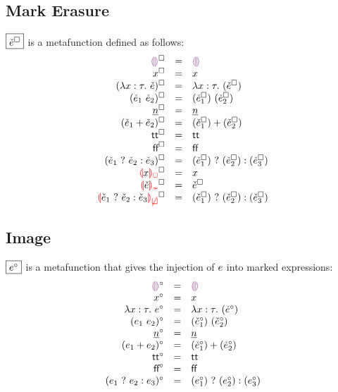 \documentclass{article}
\begin{document}
\subsection{Mark Erasure}
$\judgbox{\erase{\ECMV}}$ is a metafunction defined as follows:
%
\newcommand{\erasesToRow}[2]{\erase{#1} & = & #2}
\[\begin{array}{rcl}
  \erasesToRow{\ECEHole}{\EEHole} \\
  \erasesToRow{x}{x} \\
  \erasesToRow{(\ECLam{x}{\TMV}{\ECMV})}{\ELam{x}{\TMV}{(\erase{\ECMV})}} \\
  \erasesToRow{(\ECAp{\ECMV_1}{\ECMV_2})}{\EAp{(\erase{\ECMV_1})}{(\erase{\ECMV_2})}} \\
  \erasesToRow{\ECNumMV}{\ENumMV} \\
  \erasesToRow{(\ECPlus{\ECMV_1}{\ECMV_2})}{\EPlus{(\erase{\ECMV_1})}{(\erase{\ECMV_2})}} \\
  \erasesToRow{\ECTrue}{\ETrue} \\
  \erasesToRow{\ECFalse}{\EFalse} \\
  \erasesToRow{(\ECIf{\ECMV_1}{\ECMV_2}{\ECMV_3})}{\EIf{(\erase{\ECMV_1})}{(\erase{\ECMV_2})}{(\erase{\ECMV_3})}} \\
  \erasesToRow{\ECUnbound{x}}{x} \\
  \erasesToRow{\ECInconType{\ECMV}}{\erase{\ECMV}} \\
  \erasesToRow{\ECInconBr{\ECMV_1}{\ECMV_2}{\ECMV_3}}{\EIf{(\erase{\ECMV_1})}{(\erase{\ECMV_2})}{(\erase{\ECMV_3})}} \\
\end{array}\]

\subsection{Image}
$\judgbox{\image{\EMV}}$ is a metafunction that gives the injection of $e$ into marked
expressions:
%
\newcommand{\imageIsRow}[2]{\image{#1} & = & #2}
\[\begin{array}{rcl}
  \imageIsRow{\EEHole}{\ECEHole} \\
  \imageIsRow{x}{x} \\
  \imageIsRow{\ELam{x}{\TMV}{\EMV}}{\ECLam{x}{\TMV}{(\image{\ECMV})}} \\
  \imageIsRow{(\EAp{\EMV_1}{\EMV_2})}{\ECAp{(\image{\ECMV_1})}{(\image{\ECMV_2})}} \\
  \imageIsRow{\ENumMV}{\ECNumMV} \\
  \imageIsRow{(\EPlus{\EMV_1}{\EMV_2})}{\ECPlus{(\image{\ECMV_1})}{(\image{\ECMV_2})}} \\
  \imageIsRow{\ETrue}{\ECTrue} \\
  \imageIsRow{\EFalse}{\ECFalse} \\
  \imageIsRow{(\EIf{\EMV_1}{\EMV_2}{\EMV_3})}{\ECIf{(\image{\EMV_1})}{(\image{\EMV_2})}{(\image{\EMV_3})}} \\
\end{array}\]
\end{document}
